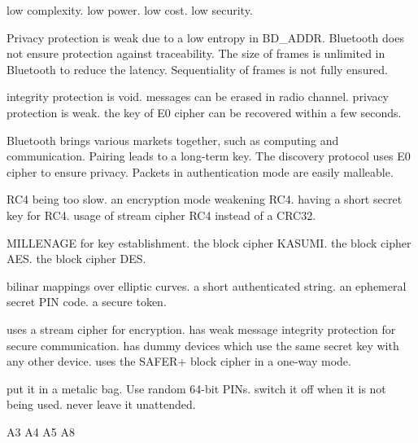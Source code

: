 {low complexity.}
{low power.}
{low cost.}
{low security.}

 {Privacy protection is weak due to a low entropy in BD\_ADDR.}
 {Bluetooth does not ensure protection against traceability.}
 {The size of frames is unlimited in Bluetooth to reduce the latency.}
 {Sequentiality of frames is not fully ensured.}
 
 {integrity protection is void.}
 {messages can be erased in radio channel.}
 {privacy protection is weak.}
 {the key of E0 cipher can be recovered within a few seconds.}
 
 {Bluetooth brings various markets together, such as computing and communication.}
 {Pairing leads to a long-term key.}
 {The discovery protocol uses E0 cipher to ensure privacy.}
 {Packets in authentication mode are easily malleable.}

 {RC4 being too slow.}
 {an encryption mode weakening RC4.}
 {having a short secret key for RC4.}
 {usage of stream cipher RC4 instead of a CRC32.}
 
 {MILLENAGE for key establishment.}
 {the block cipher KASUMI.}
 {the block cipher AES.}
 {the block cipher DES.}
 
{bilinar mappings over elliptic curves.}
{a short authenticated string.}
{an ephemeral secret PIN code.}
{a secure token.}

{uses a stream cipher for encryption.}
{has weak message integrity protection for secure communication.}
{has dummy devices which use the same secret key with any other device.}
{uses the SAFER+ block cipher in a one-way mode.}

{put it in a metalic bag.}
{Use random 64-bit PINs.}
{switch it off when it is not being used.}
{never leave it unattended.}

 {A3}
 {A4}
 {A5}
 {A8}

